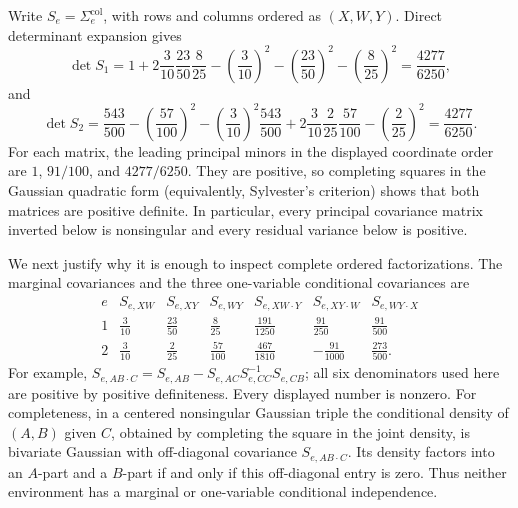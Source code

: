 Write \(S_e=\Sigma^{\mathrm{col}}_e\), with rows and columns ordered as \((X,W,Y)\). Direct determinant expansion gives
\[
 \det S_1
 =1+2\frac{3}{10}\frac{23}{50}\frac{8}{25}
   -\left(\frac{3}{10}\right)^2
   -\left(\frac{23}{50}\right)^2
   -\left(\frac{8}{25}\right)^2
 =\frac{4277}{6250},
\]
and
\[
 \det S_2
 =\frac{543}{500}
   -\left(\frac{57}{100}\right)^2
   -\left(\frac{3}{10}\right)^2\frac{543}{500}
   +2\frac{3}{10}\frac{2}{25}\frac{57}{100}
   -\left(\frac{2}{25}\right)^2
 =\frac{4277}{6250}.
\]
For each matrix, the leading principal minors in the displayed coordinate order are \(1\), \(91/100\), and \(4277/6250\). They are positive, so completing squares in the Gaussian quadratic form (equivalently, Sylvester's criterion) shows that both matrices are positive definite. In particular, every principal covariance matrix inverted below is nonsingular and every residual variance below is positive.

We next justify why it is enough to inspect complete ordered factorizations. The marginal covariances and the three one-variable conditional covariances are
\[
\begin{array}{c|ccc|ccc}
 e& S_{e,XW}&S_{e,XY}&S_{e,WY}
  &S_{e,XW\cdot Y}&S_{e,XY\cdot W}&S_{e,WY\cdot X}\\ \hline
 1&\frac3{10}&\frac{23}{50}&\frac8{25}
  &\frac{191}{1250}&\frac{91}{250}&\frac{91}{500}\\[2pt]
 2&\frac3{10}&\frac2{25}&\frac{57}{100}
  &\frac{467}{1810}&-\frac{91}{1000}&\frac{273}{500}.
\end{array}
\]
For example, \(S_{e,AB\cdot C}=S_{e,AB}-S_{e,AC}S_{e,CC}^{-1}S_{e,CB}\); all six denominators used here are positive by positive definiteness. Every displayed number is nonzero. For completeness, in a centered nonsingular Gaussian triple the conditional density of \((A,B)\) given \(C\), obtained by completing the square in the joint density, is bivariate Gaussian with off-diagonal covariance \(S_{e,AB\cdot C}\). Its density factors into an \(A\)-part and a \(B\)-part if and only if this off-diagonal entry is zero. Thus neither environment has a marginal or one-variable conditional independence.


